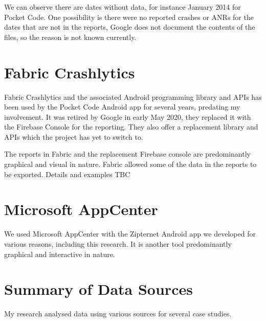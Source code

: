 We can observe there are dates without data, for instance  January 2014 for Pocket Code. One possibility is there were no reported crashes or ANRs for the dates that are not in the reports, Google does not document the contents of the files, so the reason is not known currently.

\section{Fabric Crashlytics}
Fabric Crashlytics and the associated Android programming library and APIs has been used by the Pocket Code Android app for several years, predating my involvement. It was retired by Google in early May 2020, they replaced it with the Firebase Console for the reporting. They also offer a replacement library and APIs which the project has  yet to switch to.

The reports in Fabric and the replacement Firebase console are predominantly graphical and visual in nature. Fabric allowed some of the data in the reports to be exported. Details and examples TBC %

\section{Microsoft AppCenter}
We used Microsoft AppCenter with the Zipternet Android app we developed for various reasons, including this research. It is another tool predominantly graphical and interactive in nature.

\section{Summary of Data Sources}
My research analysed data using various sources for several case studies. 